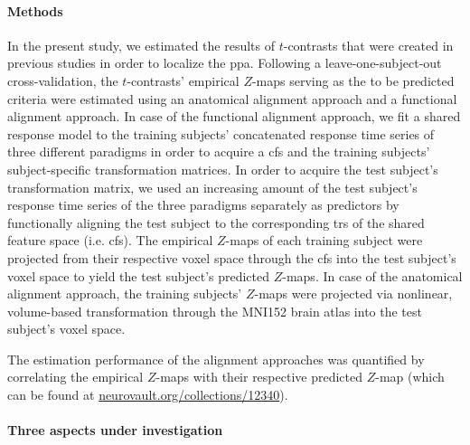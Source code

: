\paragraph{Methods}
%
In the present study, we estimated the results of $t$-contrasts that were
created in previous studies \citep{sengupta2016extension,
haeusler2022processing} in order to localize the \ac{ppa}.
%
Following a leave-one-subject-out cross-validation, the $t$-contrasts' empirical
$Z$-maps serving as the to be predicted criteria were estimated using an
anatomical alignment approach \citep[cf.][]{zhen2015quantifying,
zhen2017quantifying} and a functional alignment approach.
%
In case of the functional alignment approach, we fit a shared response model
\citep{chen2015reduced} to the training subjects' concatenated response time
series of three different paradigms in order to acquire a \ac{cfs} and the
training subjects' subject-specific transformation matrices.
%
In order to acquire the test subject's transformation matrix, we used an
increasing amount of the test subject's response time series of the three
paradigms separately as predictors by functionally aligning the test subject
to the corresponding \acp{tr} of the shared feature space (i.e. \ac{cfs}).
%
The empirical $Z$-maps of each training subject were projected from their
respective voxel space through the \ac{cfs} into the test subject's voxel space
to yield the test subject's predicted $Z$-maps.
%
In case of the anatomical alignment approach, the training subjects' $Z$-maps
were projected via nonlinear, volume-based transformation through the MNI152
brain atlas  into the test subject's voxel space.

%
The estimation performance of the alignment approaches was quantified by
correlating the empirical $Z$-maps with their respective predicted $Z$-map
(which can be found at
\href{https://identifiers.org/neurovault.collection:12340}{\url{neurovault.org/collections/12340}}).


\paragraph{Three aspects under investigation}



